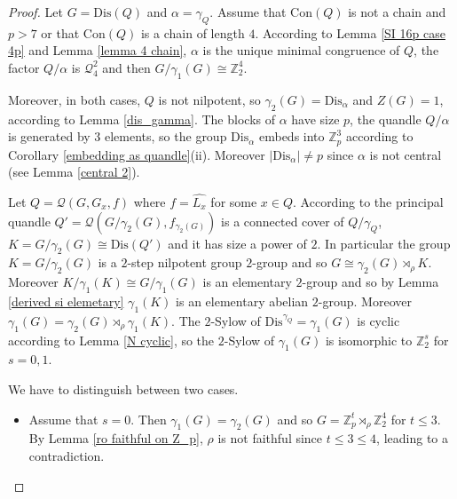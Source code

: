 \documentclass[a4paper, english, 9pt]{amsart}
\theoremstyle{plain}
\theoremstyle{definition}
\def\dis{\mathrm{Dis}}
\def\con{\mathrm{Con}}
\def\Z{\mathbb Z}
\begin{document}
\begin{proof}
Let $G=\dis(Q)$ and $\alpha=\gamma_Q$. Assume that $\con(Q)$ is not a chain and $p>7$ or that $\con(Q)$ is a chain of length $4$. According to Lemma \ref{SI 16p case 4p} and Lemma \ref{lemma 4 chain}, $\alpha$ is the unique minimal congruence of $Q$, the factor $Q/\alpha$ is $\mathcal{Q}_4^2$ and then $G/\gamma_1(G)\cong \Z_2^4$. 


Moreover, in both cases, $Q$ is not nilpotent, so $\gamma_2(G)=\dis_\alpha$ and $Z(G)=1$, according to Lemma \ref{dis_gamma}. The blocks of $\alpha$ have size $p$, the quandle $Q/\alpha$ is generated by $3$ elements, so the group $\dis_\alpha$ embeds into $\Z_p^3$ according to Corollary \ref{embedding as quandle}(ii). Moreover $|\dis_\alpha|\neq p$ since $\alpha$ is not central (see Lemma \ref{central 2}).


Let $Q=\mathcal{Q}(G,G_x,f)$ where $f=\widehat{L_x}$ for some $x\in Q$. According to \cite[Lemma 1.10]{Involutory} the principal quandle $Q'=\mathcal{Q}(G/\gamma_2(G),f_{\gamma_2(G)})$ is a connected cover of $Q/\gamma_Q$, $K=G/\gamma_2(G)\cong \dis(Q')$ and it has size a power of $2$. In particular the group $K=G/\gamma_2(G)$ is a $2$-step nilpotent group $2$-group and so $G\cong \gamma_2(G)\rtimes_\rho K$. Moreover $K/\gamma_1(K)\cong G/\gamma_1(G)$ is an elementary $2$-group and so by Lemma \ref{derived si elemetary} $\gamma_1(K)$ is an elementary abelian $2$-group. Moreover $\gamma_1(G)=\gamma_2(G)\rtimes_\rho \gamma_1(K)$. The $2$-Sylow of $\dis^{\gamma_Q}=\gamma_1(G)$ is cyclic according to Lemma \ref{N cyclic}, so the $2$-Sylow of $\gamma_1(G)$ is isomorphic to $\Z_2^s$ for $s=0,1$. 

We have to distinguish between two cases.


\begin{itemize}
    \item Assume that $s=0$. Then $\gamma_1(G)=\gamma_2(G)$ and so $G=\Z_p^t\rtimes_\rho \Z_2^4$ for $t\leq 3$. By Lemma \ref{ro faithful on Z_p}, $\rho$ is not faithful since $t\leq 3\leq 4$, leading to a contradiction. 
 


\end{itemize}
\end{proof}
\end{document}
